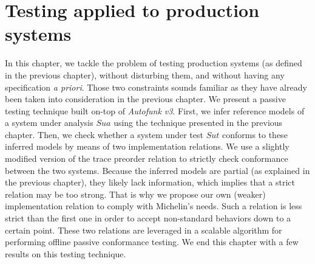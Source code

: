 %
\chapter{Testing applied to production systems}
\label{sec:testing}

In this chapter, we tackle the problem of testing production
systems (as defined in the previous chapter), without disturbing
them, and without having any specification \emph{a priori}. Those
two constraints sounds familiar as they have already been taken
into consideration in the previous chapter. We present a passive
testing technique built on-top of \emph{Autofunk v3}. First, we
infer reference models of a system under analysis $\mathit{Sua}$
using the technique presented in the previous chapter.
Then, we check whether a system under test $\mathit{Sut}$
conforms to these inferred models by means of two implementation
relations. We use a slightly modified version of the trace
preorder relation to strictly check conformance between the two
systems. Because the inferred models are partial (as explained in
the previous chapter), they likely lack information, which
implies that a strict relation may be too strong. That is why we
propose our own (weaker) implementation relation to comply with
Michelin's needs.  Such a relation is less strict than the first
one in order to accept non-standard behaviors down to a certain
point. These two relations are leveraged in a scalable algorithm
for performing offline passive conformance testing.  We end this
chapter with a few results on this testing technique.\\

\minitoc

\pagebreak






\cleardoublepage
\blankpage
